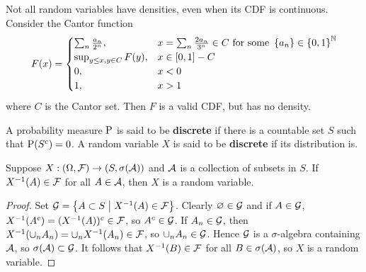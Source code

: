 \begin{example}
    Not all random variables have densities, even when its CDF is continuous. 
    Consider the Cantor function 
    \begin{equation*}
        F(x) = \begin{cases}
            \sum_n \frac{a_n}{2^n}, & x = \sum_n \frac{2a_n}{3^n}\in C\text{ for some } \set{a_n}\in\set{0,1}^\mathbb{N} \\ 
            \sup_{y\leq x, y\in C} F(y), & x\in[0,1]-C \\
            0, & x<0 \\
            1, & x>1
        \end{cases}
    \end{equation*}
    where $C$ is the Cantor set. Then $F$ is a valid CDF, but has no density.
\end{example}

\begin{definition}
    A probability measure $\P$ is said to be \textbf{discrete} if there is a countable 
    set $S$ such that $\P(S^c) = 0$. A random variable $X$ is said to be \textbf{discrete} 
    if its distribution is. 
\end{definition}

\begin{theorem}
    Suppose $X:(\Omega, \F)\to (S,\sigma(\A))$ and $\A$ is a collection of subsets 
    in $S$. If $X^{-1}(A)\in\F$ for all $A\in\A$, then $X$ is a random variable.
\end{theorem}
\begin{proof}
    Set $\G = \Set{A\subset S}{X^{-1}(A)\in\F}$. Clearly $\varnothing\in\G$ and 
    if $A\in\G$, $X^{-1}(A^c) = (X^{-1}(A))^c\in\F$, so $A^c\in\G$. If $A_n\in\G$, 
    then $X^{-1}(\cup_n A_n) = \cup_n X^{-1}(A_n)\in\F$, so $\cup_n A_n\in\G$. 
    Hence $\G$ is a $\sigma$-algebra containing $\A$, so $\sigma(\A)\subset\G$. 
    It follows that $X^{-1}(B)\in\F$ for all $B\in\sigma(\A)$, so $X$ is a 
    random variable.
\end{proof}

